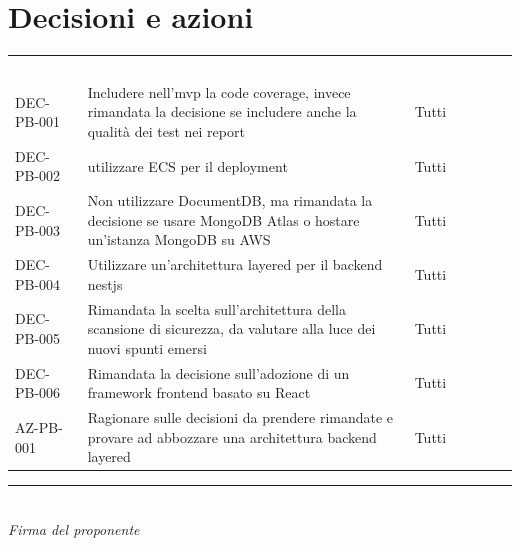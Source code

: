 \documentclass[a4paper, 11pt]{article}
\begin{document}
\section{Decisioni e azioni}
\begin{center}
    \begin{tabular}{>{\centering\arraybackslash}m{3cm} >{\raggedright\arraybackslash}p{8cm} >{\centering\arraybackslash}p{2.5cm}}
        \rowcolor{AccentColor}
        \textcolor{white}{\textbf{Codice}} & 
        \multicolumn{1}{c}{\textcolor{white}{\textbf{Descrizione}}} & 
        \textcolor{white}{\textbf{Assegnatario}} \\
        
        DEC-PB-001 & Includere nell'mvp la code coverage, invece rimandata la decisione se includere anche la qualità dei test nei report & Tutti \\

        DEC-PB-002 & utilizzare ECS per il deployment & Tutti \\

        DEC-PB-003 & Non utilizzare DocumentDB, ma rimandata la decisione se usare MongoDB Atlas o hostare un'istanza MongoDB su AWS & Tutti \\

        DEC-PB-004 & Utilizzare un'architettura layered per il backend nestjs & Tutti \\

        DEC-PB-005 & Rimandata la scelta sull'architettura della scansione di sicurezza, da valutare alla luce dei nuovi spunti emersi & Tutti \\

        DEC-PB-006 & Rimandata la decisione sull'adozione di un framework frontend basato su React & Tutti \\
        
        \midrule

        AZ-PB-001 & Ragionare sulle decisioni da prendere rimandate e provare ad abbozzare una architettura backend layered & Tutti \\


    \end{tabular}

    \vspace{1.5cm}
    \rule{6cm}{0.4pt}\\
    \textit{Firma del proponente}

\end{center}
\end{document}
